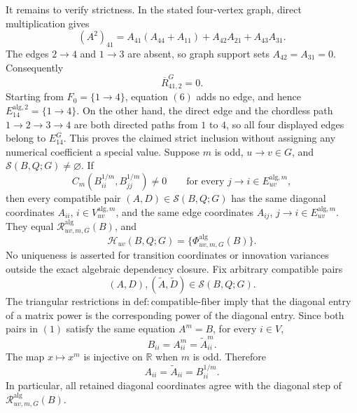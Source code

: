 It remains to verify strictness.  In the stated four-vertex graph, direct multiplication gives
\[
 (A^2)_{41}
 =A_{41}(A_{44}+A_{11})+A_{42}A_{21}+A_{43}A_{31}.
\tag{5}
\]
The edges \(2\to4\) and \(1\to3\) are absent, so graph support sets \(A_{42}=A_{31}=0\).  Consequently
\[
 \overline R^{G}_{41,2}=0.
\tag{6}
\]
Starting from \(F_0=\{1\to4\}\), equation \((6)\) adds no edge, and hence \(E_{14}^{\mathrm{alg},2}=\{1\to4\}\).  On the other hand, the direct edge and the chordless path \(1\to2\to3\to4\) are both directed paths from \(1\) to \(4\), so all four displayed edges belong to \(E_{14}^{G}\).  This proves the claimed strict inclusion without assigning any numerical coefficient a special value.
Suppose \(m\) is odd, \(u\to v\in G\), and \(\mathcal S(B,Q;G)\ne\varnothing\).  If
\[
 C_m(B_{ii}^{1/m},B_{jj}^{1/m})\ne0
 \qquad\text{for every }j\to i\in E_{uv}^{\mathrm{alg},m},
\]
then every compatible pair \((A,D)\in\mathcal S(B,Q;G)\) has the same diagonal coordinates \(A_{ii}\), \(i\in V_{uv}^{\mathrm{alg},m}\), and the same edge coordinates \(A_{ij}\), \(j\to i\in E_{uv}^{\mathrm{alg},m}\).  They equal \(\mathscr R^{\mathrm{alg}}_{uv,m,G}(B)\), and
\[
 \mathcal H_{uv}(B,Q;G)
 =\{\Phi^{\mathrm{alg}}_{uv,m,G}(B)\}.
\]
No uniqueness is asserted for transition coordinates or innovation variances outside the exact algebraic dependency closure.
Fix arbitrary compatible pairs
\[
 (A,D),(\widetilde A,\widetilde D)\in\mathcal S(B,Q;G).
\tag{1}
\]
The triangular restrictions in \(\mathrm{def{:}compatible\mbox{-}fiber}\) imply that the diagonal entry of a matrix power is the corresponding power of the diagonal entry.  Since both pairs in \((1)\) satisfy the same equation \(A^m=B\), for every \(i\in V\),
\[
 B_{ii}=A_{ii}^m=\widetilde A_{ii}^m.
\tag{2}
\]
The map \(x\mapsto x^m\) is injective on \(\mathbb R\) when \(m\) is odd.  Therefore
\[
 A_{ii}=\widetilde A_{ii}=B_{ii}^{1/m}.
\tag{3}
\]
In particular, all retained diagonal coordinates agree with the diagonal step of \(\mathscr R^{\mathrm{alg}}_{uv,m,G}(B)\).

